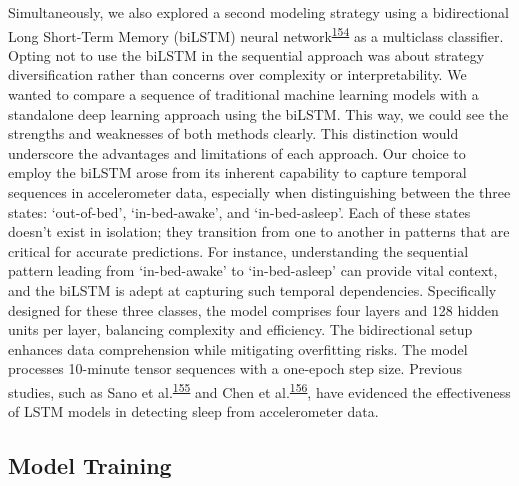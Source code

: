 \documentclass[
  10pt,
]{scrbook}
\begin{document}
Simultaneously, we also explored a second modeling strategy using a
bidirectional Long Short-Term Memory (biLSTM) neural
network\textsuperscript{\protect\hyperlink{ref-hochreiter_long_1997}{154}}
as a multiclass classifier. Opting not to use the biLSTM in the
sequential approach was about strategy diversification rather than
concerns over complexity or interpretability. We wanted to compare a
sequence of traditional machine learning models with a standalone deep
learning approach using the biLSTM. This way, we could see the strengths
and weaknesses of both methods clearly. This distinction would
underscore the advantages and limitations of each approach. Our choice
to employ the biLSTM arose from its inherent capability to capture
temporal sequences in accelerometer data, especially when distinguishing
between the three states: `out-of-bed', `in-bed-awake', and
`in-bed-asleep'. Each of these states doesn't exist in isolation; they
transition from one to another in patterns that are critical for
accurate predictions. For instance, understanding the sequential pattern
leading from `in-bed-awake' to `in-bed-asleep' can provide vital
context, and the biLSTM is adept at capturing such temporal
dependencies. Specifically designed for these three classes, the model
comprises four layers and 128 hidden units per layer, balancing
complexity and efficiency. The bidirectional setup enhances data
comprehension while mitigating overfitting risks. The model processes
10-minute tensor sequences with a one-epoch step size. Previous studies,
such as Sano et
al.\textsuperscript{\protect\hyperlink{ref-sano_multimodal_2019}{155}}
and Chen et
al.\textsuperscript{\protect\hyperlink{ref-chen_attention_2021}{156}},
have evidenced the effectiveness of LSTM models in detecting sleep from
accelerometer data.

\hypertarget{model-training}{%
\subsection{Model Training}\label{model-training}}
\end{document}
